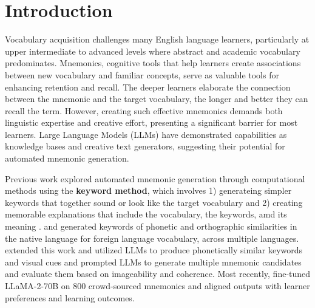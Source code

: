 
\section{Introduction} \label{sec:intro}
Vocabulary acquisition challenges many English language learners, particularly at upper intermediate to advanced levels where abstract and academic vocabulary predominates. Mnemonics, cognitive tools that help learners create associations between new vocabulary and familiar concepts, serve as valuable tools for enhancing retention and recall. The deeper learners elaborate the connection between the mnemonic and the target vocabulary, the longer and better they can recall the term. However, creating such effective mnemonics demands both linguistic expertise and creative effort, presenting a significant barrier for most learners. Large Language Models (LLMs) have demonstrated capabilities as knowledge bases and creative text generators, suggesting their potential for automated mnemonic generation.

Previous work explored automated mnemonic generation through computational methods using the \textbf{keyword method}, which involves 1) generateing simpler keywords that together sound or look like the target vocabulary and 2) creating memorable explanations that include the vocabulary, the keywords, amd its meaning \citep{atkinsonApplicationMnemonicKeyword1975}. \citet{savvaTransPhonerAutomatedMnemonic2014} and \citet{OzbalAUTOMATION2014} generated keywords of phonetic and orthographic similarities in the native language for foreign language vocabulary, across multiple languages. \citet{LeeSMARTPHONE2023} extended this work and utilized LLMs to produce phonetically similar keywords and visual cues and \citet{LeeEXPLORING2024} prompted LLMs to generate multiple mnemonic candidates and evaluate them based on imageability and coherence. Most recently, \citet{balepurSMART2024} fine-tuned LLaMA-2-70B on 800 crowd-sourced mnemonics and aligned outputs with learner preferences and learning outcomes.


